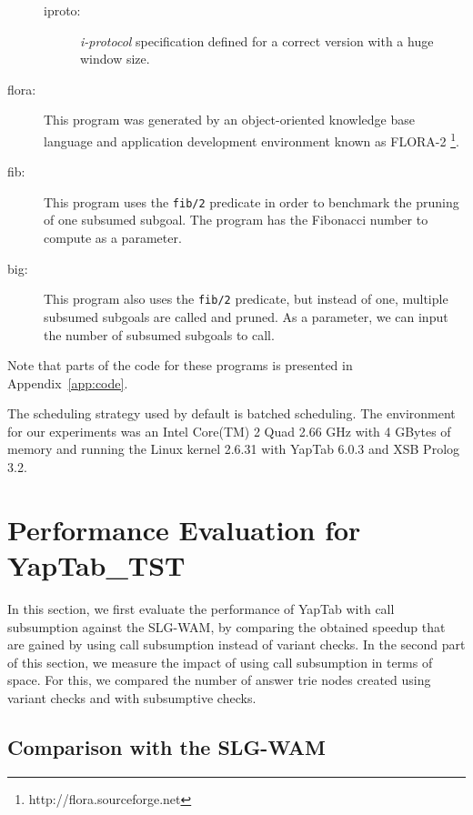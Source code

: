\begin{description}
\begin{description}
         \item[iproto:] \emph{i-protocol} specification defined for a correct version with a huge window size.

      \end{description}
      
   \item[flora:] This program was generated by an object-oriented knowledge base language and application 
               development environment known as FLORA-2 \cite{Yang-00} \footnote{http://flora.sourceforge.net}.
               
   \item[fib:] This program uses the \texttt{fib/2} predicate in order to benchmark the pruning of one subsumed subgoal.
   The program has the Fibonacci number to compute as a parameter.
   
   \item[big:] This program also uses the \texttt{fib/2} predicate, but instead of one, multiple subsumed subgoals
   are called and pruned. As a parameter, we can input the number of subsumed subgoals to call.
   
\end{description}

Note that parts of the code for these programs is presented in Appendix~\ref{app:code}.

The scheduling strategy used by default is batched scheduling.
The environment for our experiments was an Intel Core(TM) 2 Quad 2.66 GHz with 4 GBytes of
memory and running the Linux kernel 2.6.31 with YapTab 6.0.3 and XSB Prolog 3.2.

\section{Performance Evaluation for YapTab\_TST}

In this section, we first evaluate the performance of YapTab with call subsumption against the SLG-WAM,
by comparing the obtained speedup that are gained by using call subsumption instead of variant checks.
In the second part of this section, we measure the impact of using call subsumption in terms of space.
For this, we compared the number of answer trie nodes created using variant checks and with subsumptive
checks.

\subsection{Comparison with the SLG-WAM}

